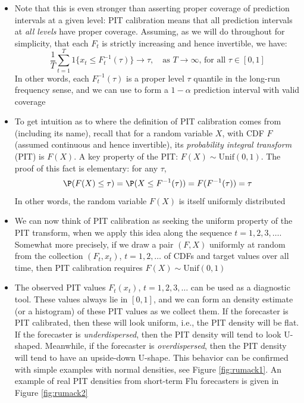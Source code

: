 \documentclass{article}
\begin{document}
\begin{itemize}
\item Note that this is even stronger than asserting proper coverage of
  prediction intervals at a given level: PIT calibration means that all
  prediction intervals at \emph{all levels} have proper coverage. Assuming, as
  we will do throughout for simplicity, that each $F_t$ is strictly increasing
  and hence invertible, we have:    
  \[
  \frac{1}{T} \sum_{t=1}^T 1\{ x_t \leq F^{-1}_t(\tau) \} \to \tau, \quad
  \text{as $T \to \infty$, for all $\tau \in [0,1]$} 
  \]
  In other words, each $F^{-1}_t(\tau)$ is a proper level $\tau$ quantile in the
  long-run frequency sense, and we can use  to form a $1-\alpha$ prediction interval with valid
  coverage 

\item To get intuition as to where the definition of PIT calibration comes from 
  (including its name), recall that for a random variable $X$, with CDF $F$
  (assumed continuous and hence invertible), its \emph{probability integral
    transform} (PIT) is $F(X)$. A key property of the PIT: $F(X) \sim
  \mathrm{Unif}(0,1)$. The proof of this fact is elementary: for any $\tau$, 
  \[
  \P(F(X) \leq \tau) = \P(X \leq F^{-1}(\tau)) = F(F^{-1}(\tau)) = \tau
  \]
  In other words, the random variable $F(X)$ is itself uniformly distributed 

\item We can now think of PIT calibration as seeking the uniform property of 
  the PIT transform, when we apply this idea along the sequence $t =
  1,2,3,\dots$. Somewhat more precisely, if we draw a pair $(F,X)$ uniformly at
  random from the collection $(F_t,x_t)$, $t = 1,2,\dots$ of CDFs and target
  values over all time, then PIT calibration requires $F(X) \sim
  \mathrm{Unif}(0,1)$     

\item The observed PIT values $F_t(x_t)$, $t = 1,2,3,\dots$ can be used as a
  diagnostic tool. These values always lie in $[0,1]$, and we can form an
  density estimate (or a histogram) of these PIT values as we collect them. If 
  the forecaster is PIT calibrated, then these will look uniform, i.e., the PIT
  density will be flat. If the forecaster is \emph{underdispersed}, then the PIT
  density will tend to look U-shaped. Meanwhile, if the forecaster is
  \emph{overdispersed}, then the PIT density will tend to have an upside-down  
  U-shape. This behavior can be confirmed with simple examples with normal
  densities, see Figure \ref{fig:rumack1}. An example of real PIT densities from
  short-term Flu forecasters is given in Figure \ref{fig:rumack2}  


\end{itemize}
\end{document}

